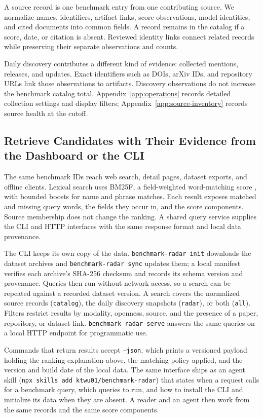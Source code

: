 \documentclass[11pt]{article}
\begin{document}
A source record is one benchmark entry from one contributing source. We normalize names, identifiers, artifact links, score observations, model identities, and cited documents into common fields. A record remains in the catalog if a score, date, or citation is absent. Reviewed identity links connect related records while preserving their separate observations and counts.

Daily discovery contributes a different kind of evidence: collected mentions, releases, and updates. Exact identifiers such as DOIs, arXiv IDs, and repository URLs link those observations to artifacts. Discovery observations do not increase the benchmark catalog total. Appendix~\ref{app:operations} records detailed collection settings and display filters; Appendix~\ref{app:source-inventory} records source health at the cutoff.

\subsection{Retrieve Candidates with Their Evidence from the Dashboard or the CLI}

The same benchmark IDs reach web search, detail pages, dataset exports, and offline clients. Lexical search uses BM25F, a field-weighted word-matching score \citep{robertson2004bm25f}, with bounded boosts for name and phrase matches. Each result exposes matched and missing query words, the fields they occur in, and the score components. Source membership does not change the ranking. A shared query service supplies the CLI and HTTP interfaces with the same response format and local data provenance.

The CLI keeps its own copy of the data. \texttt{benchmark-radar init} downloads the dataset archives and \texttt{benchmark-radar sync} updates them; a local manifest verifies each archive's SHA-256 checksum and records its schema version and provenance. Queries then run without network access, so a search can be repeated against a recorded dataset version. A search covers the normalized source records (\texttt{catalog}), the daily discovery snapshots (\texttt{radar}), or both (\texttt{all}). Filters restrict results by modality, openness, source, and the presence of a paper, repository, or dataset link. \texttt{benchmark-radar serve} answers the same queries on a local HTTP endpoint for programmatic use.

Commands that return results accept \texttt{--json}, which prints a versioned payload holding the ranking explanation above, the matching policy applied, and the version and build date of the local data. The same interface ships as an agent skill (\texttt{npx skills add ktwu01/benchmark-radar}) that states when a request calls for a benchmark query, which queries to run, and how to install the CLI and initialize its data when they are absent. A reader and an agent then work from the same records and the same score components.
\end{document}
